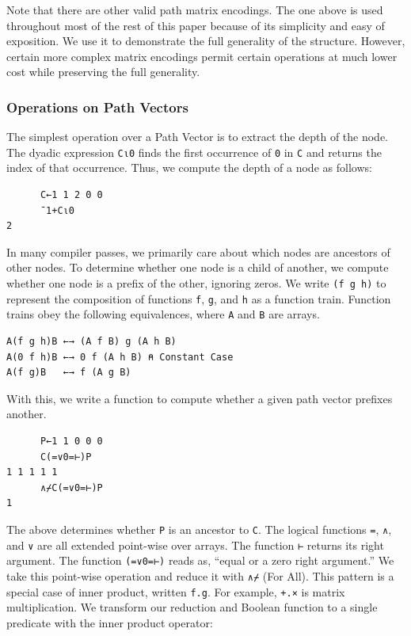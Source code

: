 ﻿\documentclass[numbers,10pt,preprint]{sigplanconf}
\begin{document}
Note that there are other valid path matrix encodings. The one above is used throughout most of the rest of this paper because of its simplicity and easy of exposition. We use it to demonstrate the full generality of the structure. However, certain more complex matrix encodings permit certain operations at much lower cost while preserving the full generality. 

\subsubsection{Operations on Path Vectors}

The simplest operation over a Path Vector is to extract the depth of the node. The dyadic expression \verb;C⍳0; finds the first occurrence of \verb;0; in \verb;C; and returns the index of that occurrence. Thus, we compute the depth of a node as follows:

\begin{verbatim}
      C←1 1 2 0 0
      ¯1+C⍳0
2
\end{verbatim}

\noindent In many compiler passes, we primarily care about which nodes are ancestors of other nodes. To determine whether one node is a child of another, we compute whether one node is a prefix of the other, ignoring zeros. We write \verb;(f g h); to represent the composition of functions \verb;f;, \verb;g;, and \verb;h; as a function train. Function trains obey the following equivalences, where \verb;A; and \verb;B; are arrays.

\begin{verbatim}
A(f g h)B ←→ (A f B) g (A h B)
A(0 f h)B ←→ 0 f (A h B) ⍝ Constant Case
A(f g)B   ←→ f (A g B)
\end{verbatim}

\noindent With this, we write a function to compute whether a given path vector prefixes another.

\begin{verbatim}
      P←1 1 0 0 0
      C(=∨0=⊢)P
1 1 1 1 1
      ∧⌿C(=∨0=⊢)P
1
\end{verbatim}

\noindent The above determines whether \verb;P; is an ancestor to \verb;C;. The logical functions \verb;=;, \verb;∧;, and \verb;∨; are all extended point-wise over arrays. The function \verb;⊢; returns its right argument. The function \verb;(=∨0=⊢); reads as, ``equal or a zero right argument.'' We take this point-wise operation and reduce it with \verb;∧⌿; (For All). This pattern is a special case of inner product, written \verb;f.g;. For example, \verb;+.×; is matrix multiplication. We transform our reduction and Boolean function to a single predicate with the inner product operator:
\end{document}
